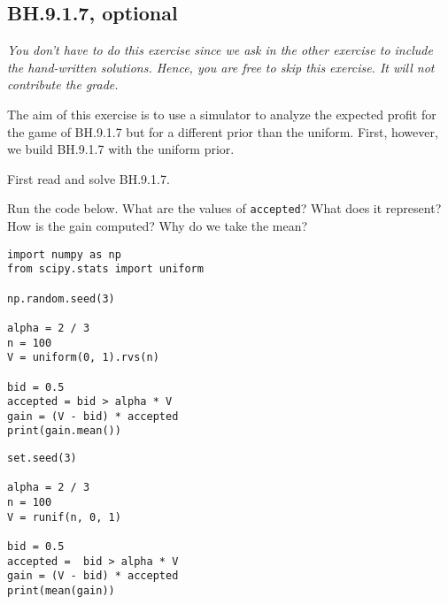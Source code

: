\subsection{BH.9.1.7, optional}
\label{sec:bh.9.1.7}




\emph{You don't have to do this exercise since we ask in the other exercise to include the hand-written solutions. Hence, you are free to skip this exercise. It will not contribute the grade.}

The aim of this exercise is to use a simulator to analyze the expected profit for the game of BH.9.1.7 but for a different prior than the uniform.
First, however, we build BH.9.1.7 with the uniform prior.

First read and solve BH.9.1.7.

\begin{exercise}
Run the code below. What are the values of \verb|accepted|? What does it represent? How is the gain computed? Why do we take the mean?
\begin{verbatim}
import numpy as np
from scipy.stats import uniform

np.random.seed(3)

alpha = 2 / 3
n = 100
V = uniform(0, 1).rvs(n)

bid = 0.5
accepted = bid > alpha * V
gain = (V - bid) * accepted
print(gain.mean())
\end{verbatim}

\begin{verbatim}
set.seed(3)

alpha = 2 / 3
n = 100
V = runif(n, 0, 1)

bid = 0.5
accepted =  bid > alpha * V
gain = (V - bid) * accepted
print(mean(gain))
\end{verbatim}
\end{exercise}


